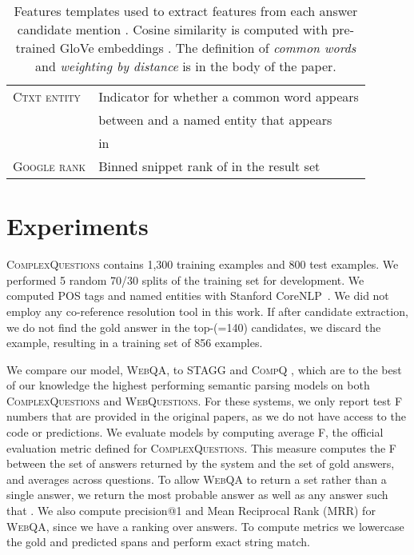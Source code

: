 \documentclass[11pt,a4paper]{article}
\begin{document}
\begin{table}[t]
\begin{center}
{\begin{tabular}{l|l}
\textsc{Ctxt entity} & Indicator for whether a common word appears \\
& between  and a named entity that appears\\
&in \\ 
\textsc{Google rank} & Binned snippet rank of  in the result set  \\
\toprule
\end{tabular}}
\end{center}
\caption{Features templates used to extract features from each answer candidate mention . Cosine similarity is computed with pre-trained GloVe embeddings \cite{pennington2014glove}. The definition of \emph{common words} and \emph{weighting by distance} is in the body of the paper.}
\label{tab:features}
\end{table}


 \section{Experiments}
\label{sec:experiments}

\textsc{ComplexQuestions} contains 1,300 training examples and 800 test examples. We performed 5 random 70/30 splits of the training set for development. We computed POS tags and named entities with Stanford CoreNLP~\cite{manning2014stanford}. We did not employ any co-reference resolution tool in this work. If after candidate extraction, we do not find the gold answer in the top-(=140) candidates, we discard the example, resulting in a training set of 856 examples. 

We compare our model, \textsc{WebQA}, to \textsc{STAGG} \cite{yih2015stagg} and \textsc{CompQ} \cite{bao2016constraint}, which are to the best of our knowledge the highest performing semantic parsing models on both \textsc{ComplexQuestions} and \textsc{WebQuestions}. For these systems, we only report test F numbers that are provided in the original papers, as we do not have access to the code or predictions.
We evaluate models by computing average F, the official evaluation metric defined for \textsc{ComplexQuestions}. This measure computes the F between the set of answers returned by the system and the set of gold answers, and averages across questions. To allow \textsc{WebQA} to return a set rather than a single answer, we return the most probable answer  as well as any answer  such that .
We also compute precision@1 and Mean Reciprocal Rank (MRR) for \textsc{WebQA}, since we have a ranking  over answers.
To compute metrics we lowercase the gold and predicted spans and perform exact string match.
\end{document}
